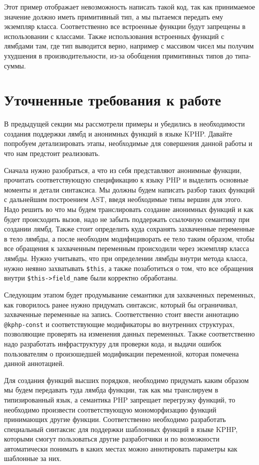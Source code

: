 Этот пример отображает невозможность написать такой код, так как принимаемое значение должно иметь примитивный тип, а мы пытаемся передать ему экземпляр класса.
Соответственно все встроенные функции будут запрещены в использовании с классами.
Также использования встроенных функций с лямбдами там, где тип выводится верно, например с массивом чисел мы получим ухудшения в производительности, из-за обобщения примитивных типов до типа-суммы.


\section{Уточненные требования к работе}
В предыдущей секции мы рассмотрели примеры и убедились в необходимости создания поддержки лямбд и анонимных функций в языке KPHP. Давайте попробуем детализировать этапы, необходимые для совершения данной работы и что нам предстоит реализовать.

Сначала нужно разобраться, а что из себя представляют анонимные функции, прочитать соответствующую спецификацию к языку PHP и выделить основные моменты и детали синтаксиса.
Мы должны будем написать разбор таких функций с дальнейшим построением AST, введя необходимые типы вершин для этого.
Надо решить во что мы будем транслировать создание анонимных функций и как будет происходить вызов, надо не забыть поддержать ссылочную семантику при создании лямбд.
Также стоит определить куда сохранять захваченные переменные в тело лямбды, а после необходим модифициворать ее тело таким образом, чтобы все обращения к захваченным переменным происходили через экземпляр класса лямбды.
Нужно учитывать, что при определении лямбды внутри метода класса, нужно неявно захватывать \verb|$this|, а также позаботиться о том, что все обращения внутри \verb|$this->field_name| были корректно обработаны.

Следующим этапом будет продумывание семантики для захваченных переменных, как говорилось ранее нужно придумать синтаксис, который бы ограничивал, захваченные переменные на запись.
Соответственно стоит ввести аннотацию \verb|@kphp-const| и соответствующие модификаторы во внутренних структурах, позволяющие проверять на изменения данных переменных.
Также соответственно надо разработать инфраструктуру для проверки кода, и выдачи ошибок пользователям о произошедшей модификации переменной, которая помечена данной аннотацией.

Для создания функций высших порядков, необходимо придумать каким образом мы будем передавать туда лямбда функции, так как мы транслируем в типизированный язык, а семантика PHP запрещает перегрузку функций, то необходимо произвести соответствующую мономорфизацию функций принимающих другие функции.
Соответственно необходимо разработать специальный синтаксис для поддержки шаблонных функций в языке KPHP, которыми смогут пользоваться другие разработчики и по возможности автоматически понимать в каких местах можно аннотировать параметры как шаблонные за них.

